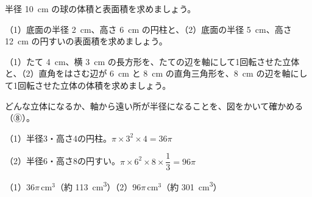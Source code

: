 \noindent\begin{minipage}[t]{0.485\linewidth}\vspace{0pt}\raggedright
\begin{jibun}\raggedright
半径 \qty{10}{cm} の球の体積と表面積を求めましょう。
\end{jibun}
\end{minipage}\hfill
\begin{minipage}[t]{0.485\linewidth}\vspace{0pt}\raggedright
\begin{jibun}\raggedright
（1）底面の半径 \qty{2}{cm}、高さ \qty{6}{cm} の円柱と、（2）底面の半径 \qty{5}{cm}、高さ \qty{12}{cm} の円すいの表面積を求めましょう。
\end{jibun}
\end{minipage}

\begin{reidai}[回転体の体積]
（1）たて \qty{4}{cm}、横 \qty{3}{cm} の長方形を、たての辺を軸にして1回転させた立体と、（2）直角をはさむ辺が \qty{6}{cm} と \qty{8}{cm} の直角三角形を、\qty{8}{cm} の辺を軸にして1回転させた立体の体積を求めましょう。\par
\kangaekata どんな立体になるか、軸から遠い所が半径になることを、図をかいて確かめる（⑧）。\par
\shiki（1）半径3・高さ4の円柱。$\pi\times3^2\times4=36\pi$\par
\hspace*{2.6\zw}（2）半径6・高さ8の円すい。$\pi\times6^2\times8\times\dfrac{1}{3}=96\pi$\par
\kotae（1）$36\pi$\,cm$^3$（約 \qty{113}{cm^3}）\quad（2）$96\pi$\,cm$^3$（約 \qty{301}{cm^3}）
\end{reidai}

